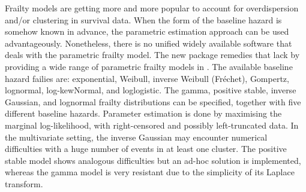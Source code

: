 Frailty models are getting more and more popular to account for overdispersion and/or clustering in survival data.
When the form of the baseline hazard is somehow known in advance, the parametric estimation approach can be used advantageously.
Nonetheless, there is no unified widely available software that deals with the parametric frailty model.
The new  package remedies that lack by providing
    a wide range of parametric frailty models in .
The available baseline hazard failies are:
    exponential, Weibull, inverse Weibull (Fr\'echet), Gompertz,
    lognormal, log-kewNormal, and loglogistic.
The gamma, positive stable, inverse Gaussian, and lognormal
    frailty distributions can be specified, together with five different baseline hazards.
Parameter estimation is done by maximising the marginal log-likelihood, with right-censored and possibly left-truncated data.
In the multivariate setting, the inverse Gaussian may encounter numerical difficulties with a huge number of events in at least one cluster.
The positive stable model shows analogous difficulties but an ad-hoc solution is implemented, whereas the gamma model is very resistant due to the simplicity of its Laplace transform.